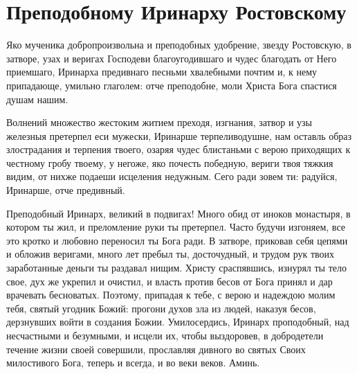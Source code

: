 \section{Преподобному Иринарху Ростовскому}\begin{mymulticols}


Яко мученика добропроизвольна и преподобных удобрение, звезду Ростовскую, в затворе, узах и веригах Господеви благоугодившаго и чудес благодать от Него приемшаго, Иринарха предивнаго песньми хвалебными почтим и, к нему припадающе, умильно глаголем: отче преподобне, моли Христа Бога спастися душам нашим.


Волнений множество жестоким житием преходя, изгнания, затвор и узы железныя претерпел еси мужески, Иринарше терпеливодушне, нам оставль образ злострадания и терпения твоего, озаряя чудес блистаньми с верою приходящих к честному гробу твоему, у негоже, яко почесть победную, вериги твоя тяжкия видим, от нихже подаеши исцеления недужным. Сего ради зовем ти: радуйся, Иринарше, отче предивный.


Преподобный Иринарх, великий в подвигах! Много обид от иноков монастыря, в котором ты жил, и преломление руки ты претерпел. Часто будучи изгоняем, все это кротко и любовно переносил ты Бога ради. В затворе, приковав себя цепями и обложив веригами, много лет пребыл ты, досточудный, и трудом рук твоих заработанные деньги ты раздавал нищим. Христу сраспявшись, изнурял ты тело свое, дух же укрепил и очистил, и власть против бесов от Бога принял и дар врачевать бесноватых. Поэтому, припадая к тебе, с верою и надеждою молим тебя, святый угодник Божий: прогони духов зла из людей, наказуя бесов, дерзнувших войти в создания Божии. Умилосердись, Иринарх проподобный, над несчастными и безумными, и исцели их, чтобы выздоровев, в добродетели течение жизни своей совершили, прославляя дивного во святых Своих милостивого Бога, теперь и всегда, и во веки веков. Аминь.

\end{mymulticols}

